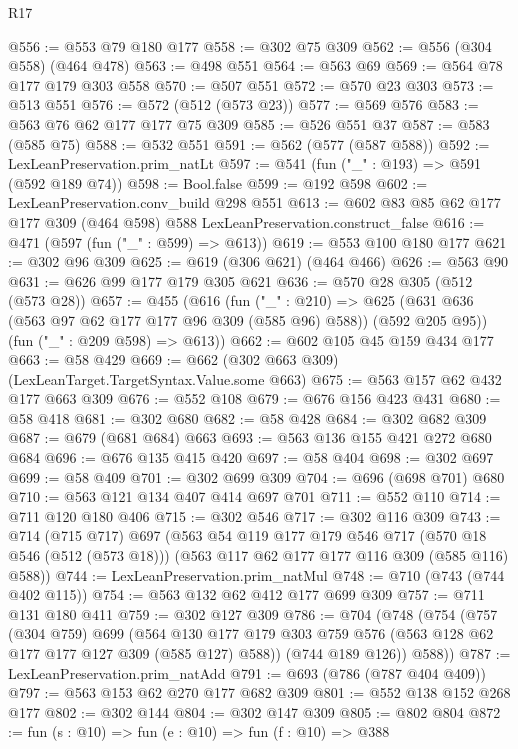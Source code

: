 \begin{lexlean}{R17}
\begin{coremodule}
@556 := @553 @79 @180 @177
@558 := @302 @75 @309
@562 := @556 (@304 @558) (@464 @478)
@563 := @498 @551
@564 := @563 @69
@569 := @564 @78 @177 @179 @303 @558
@570 := @507 @551
@572 := @570 @23 @303
@573 := @513 @551
@576 := @572 (@512 (@573 @23))
@577 := @569 @576
@583 := @563 @76 @62 @177 @177 @75 @309
@585 := @526 @551 @37
@587 := @583 (@585 @75)
@588 := @532 @551
@591 := @562 (@577 (@587 @588))
@592 := LexLeanPreservation.prim_natLt
@597 := @541 (fun ("_" : @193) => @591 (@592 @189 @74))
@598 := Bool.false
@599 := @192 @598
@602 := LexLeanPreservation.conv_build @298 @551
@613 := @602 @83 @85 @62 @177 @177 @309 (@464 @598) @588 LexLeanPreservation.construct_false
@616 := @471 (@597 (fun ("_" : @599) => @613))
@619 := @553 @100 @180 @177
@621 := @302 @96 @309
@625 := @619 (@306 @621) (@464 @466)
@626 := @563 @90
@631 := @626 @99 @177 @179 @305 @621
@636 := @570 @28 @305 (@512 (@573 @28))
@657 := @455
    (@616
      (fun ("_" : @210) =>
      @625 (@631 @636 (@563 @97 @62 @177 @177 @96 @309 (@585 @96) @588)) (@592 @205 @95))
      (fun ("_" : @209 @598) => @613))
@662 := @602 @105 @45 @159 @434 @177
@663 := @58 @429
@669 := @662 (@302 @663 @309) (LexLeanTarget.TargetSyntax.Value.some @663)
@675 := @563 @157 @62 @432 @177 @663 @309
@676 := @552 @108
@679 := @676 @156 @423 @431
@680 := @58 @418
@681 := @302 @680
@682 := @58 @428
@684 := @302 @682 @309
@687 := @679 (@681 @684) @663
@693 := @563 @136 @155 @421 @272 @680 @684
@696 := @676 @135 @415 @420
@697 := @58 @404
@698 := @302 @697
@699 := @58 @409
@701 := @302 @699 @309
@704 := @696 (@698 @701) @680
@710 := @563 @121 @134 @407 @414 @697 @701
@711 := @552 @110
@714 := @711 @120 @180 @406
@715 := @302 @546
@717 := @302 @116 @309
@743 := @714
    (@715 @717)
    @697
    (@563
      @54
      @119
      @177
      @179
      @546
      @717
      (@570 @18 @546 (@512 (@573 @18)))
      (@563 @117 @62 @177 @177 @116 @309 (@585 @116) @588))
@744 := LexLeanPreservation.prim_natMul
@748 := @710 (@743 (@744 @402 @115))
@754 := @563 @132 @62 @412 @177 @699 @309
@757 := @711 @131 @180 @411
@759 := @302 @127 @309
@786 := @704
    (@748
      (@754
        (@757
          (@304 @759)
          @699
          (@564 @130 @177 @179 @303 @759 @576 (@563 @128 @62 @177 @177 @127 @309 (@585 @127) @588))
          (@744 @189 @126))
        @588))
@787 := LexLeanPreservation.prim_natAdd
@791 := @693 (@786 (@787 @404 @409))
@797 := @563 @153 @62 @270 @177 @682 @309
@801 := @552 @138 @152 @268 @177
@802 := @302 @144
@804 := @302 @147 @309
@805 := @802 @804
@872 := fun (s : @10) =>
  fun (e : @10) =>
  fun (f : @10) =>
  @388

\end{coremodule}
\end{lexlean}
